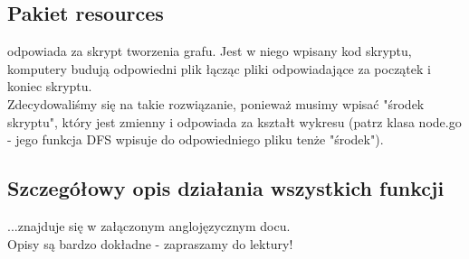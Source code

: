 \subsection{Pakiet resources}
\indent odpowiada za skrypt tworzenia grafu. Jest w niego wpisany kod skryptu, komputery budują odpowiedni plik łącząc pliki odpowiadające za początek i koniec skryptu.\\
\indent Zdecydowaliśmy się na takie rozwiązanie, ponieważ musimy wpisać "środek skryptu", który jest zmienny i odpowiada za kształt wykresu (patrz klasa node.go - jego funkcja DFS wpisuje do odpowiedniego pliku tenże "środek").

\subsection{Szczegółowy opis działania wszystkich funkcji}
...znajduje się w załączonym anglojęzycznym docu.\\
Opisy są bardzo dokładne - zapraszamy do lektury!
